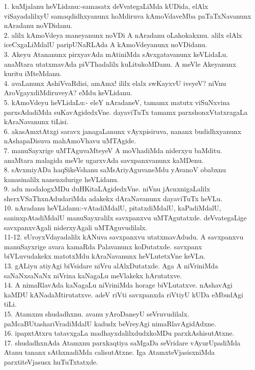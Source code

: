\documentclass{article}
\begin{document}
1. kuMjalanu heVLidanu:-samasatx deVvategaLiMda kUDida, elAlx viSayadalilxyU samaqdidhxyanunx hoMdiruva kAmoVdaveMba paTaTxNavanunx nAradanu noVDidanu.\\
2. alilx kAmoVdeya maneyanunx noVDi A nAradanu oLahokakxnu. alilx elAlx iceCxgaLiMdalU paripUNaRLAda A kAmoVdeyanunx noVDidanu.\\
3. Akeyu Atananunx pirxyavAda mAtiniMda sAvxgatavanunx keVLidaLu. anaMtara utatxmavAda piVThadalilx kuLitukoMDanu. A meVle Akeyanunx kuritu iMteMdanu.\\
4. avaLanunx AshiVvaRdisi, amAmx! ililx elalx swKayxvU iveyeV? niVnu AroVgayxdiMdiruveyA? eMdu keVLidanu.\\
5. kAmoVdeyu heVLidaLu:- eleY nAradaneV, tamamx matutx viSuNxvina parxsAdadiMda suKavAgidedxVne. dayaviTuTx tamamx parxshonxVtatxragaLa kAraNavanunx tiLisi.\\
6. akasAmxtAtxgi saravx janagaLanunx vAyxpisiruva, nananx budidhxyanunx nAshapaDisuva mahAmoVhavu uMTAgide.\\
7. manuSayxrige uMTAguvaMteyeV A moVhadiMda niderxyu baMditu. anaMtara malagida meVle ugarxvAda savxpanxvanunx kaMDenu.\\
8. sAvxmiyADa haqSikeVshanu saMsAriyAguvaneMdu yAvanoV obabxnu kanasinalilx nanenxdurige heVLidanu.\\
9. adu modalogxMDu duHKitaLAgidedxVne. niVnu jAcnxnigaLalilx sherxVSaThxnAdudariMda adakekx dAraNavanunx dayaviTuTx heVLu.\\
10. nAradanu heVLidanu:-vAtadiMdalU, pitatxdiMdalU, kaPadiMdalU, saninxpAtadiMdalU manuSayxralilx savxpanxvu uMTAgutatxde. deVvategaLige savxpanxvAgali niderxyAgali uMTAguvudilalx.\\
11-12. sUroyxVdayadalilx kANuva savxpanxvu utatxmavAdudu. A savxpanxvu manuSayxrige avara kamaRda Palavanunx koDutatxde. savxpanx biVLuvudakekx matotxMdu kAraNavanunx heVLutetxVne keVLu.\\
13. gALiyu atiyAgi biVsidare niVru alAlxDutatxde. Aga A niVriniMda saNaNxsaNaNx niVrina kaNagaLu meVlakekx hArutatxve.\\
14. A nimaRlavAda kaNagaLu niVriniMda horage biVLutatxve. nAshavAgi kaMDU kANadaMtirutatxve. adeV riVti savxpanxda riVtiyU kUDa eMbudAgi tiLi.\\
15. Atamxnu shudadhxnu. avanu yAroDaneyU seVruvudilalx. paMcaBUtashariVradiMdalU kadudx beVreyAgi nimaRlavAgidAdxne.\\
16. ipapxtAtxru tatavxgaLa madhayxdalilxdudxkoMDu parxkAshisutAtxne.\\
17. shudadhxnAda Atamxnu parxkaqtiya saMgaDa seVridare vAyurUpadiMda Atanu tananx sAthxnadiMda calisutAtxne. Iga AtamxteVjasisxniMda parxtiteVjasusx huTuTxtatxde.\\
\end{document}
